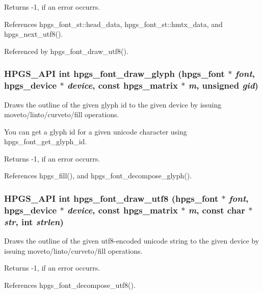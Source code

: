 Returns -\/1, if an error occurrs. 

References hpgs\_\-font\_\-st::head\_\-data, hpgs\_\-font\_\-st::hmtx\_\-data, and hpgs\_\-next\_\-utf8().



Referenced by hpgs\_\-font\_\-draw\_\-utf8().

\subsubsection[{hpgs\_\-font\_\-draw\_\-glyph}]{\setlength{\rightskip}{0pt plus 5cm}HPGS\_\-API int hpgs\_\-font\_\-draw\_\-glyph ({\bf hpgs\_\-font} $\ast$ {\em font}, \/  {\bf hpgs\_\-device} $\ast$ {\em device}, \/  const {\bf hpgs\_\-matrix} $\ast$ {\em m}, \/  unsigned {\em gid})}\label{group__font_gae8c95c21bbd2ee5ad75adf6ddcce6f4c}
Draws the outline of the given glyph id to the given device by issuing moveto/linto/curveto/fill operations.

You can get a glyph id for a given unicode character using {\ttfamily hpgs\_\-font\_\-get\_\-glyph\_\-id}.

Returns -\/1, if an error occurrs. 

References hpgs\_\-fill(), and hpgs\_\-font\_\-decompose\_\-glyph().

\subsubsection[{hpgs\_\-font\_\-draw\_\-utf8}]{\setlength{\rightskip}{0pt plus 5cm}HPGS\_\-API int hpgs\_\-font\_\-draw\_\-utf8 ({\bf hpgs\_\-font} $\ast$ {\em font}, \/  {\bf hpgs\_\-device} $\ast$ {\em device}, \/  const {\bf hpgs\_\-matrix} $\ast$ {\em m}, \/  const char $\ast$ {\em str}, \/  int {\em strlen})}\label{group__font_ga3bc1d462a0ac9cdbba24ef61cd25112b}
Draws the outline of the given utf8-\/encoded unicode string to the given device by issuing moveto/linto/curveto/fill operations.

Returns -\/1, if an error occurrs. 

References hpgs\_\-font\_\-decompose\_\-utf8().

